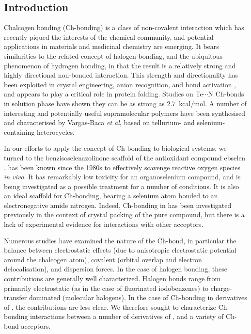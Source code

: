\begin{refsection}
\section{Introduction}
Chalcogen bonding (Ch-bonding) is a class of non-covalent interaction which has recently piqued the interests of the chemical community, and potential applications in materials and medicinal chemistry are emerging.\autocite{Mitchell2017,Wonner2017a,Fanfrlik2014,Vogel2019}
It bears similarities to the related concept of halogen bonding, and the ubiquitous phenomenon of hydrogen bonding, in that the result is a relatively strong and highly directional non-bonded interaction.\autocite{Paolo1974}
This strength and directionality has been exploited in crystal engineering\autocite{Gleiter2003,Kremer2016,Huynh2017}, anion recognition\autocite{Lim2017,Lim2018,Garrett2016}, and bond activation \autocite{Wonner2017,Benz2017,Benz2017a}, and appears to play a critical role in protein folding\autocite{Iwaoka2001,Iwaoka2015}.
Studies on Te$\cdots$N Ch-bonds in solution phase have shown they can be as strong as 2.7~kcal/mol\autocite{Garrett2015a}.
A number of interesting and potentially useful supramolecular polymers have been synthesised and characterised by Vargas-Baca \emph{et al}, based on tellurium- and selenium-containing heterocycles\autocite{Ho2016,Ho2017}.

In our efforts to apply the concept of Ch-bonding to biological systems, we turned to the benzisoselenazolinone scaffold of the antioxidant compound ebselen .
 has been known since the 1980s to effectively scavenge reactive oxygen species \emph{in vivo}.\autocite{Muller1984}
It has remarkably low toxicity for an organoselenium compound, and is being investigated as a possible treatment for a number of conditions.\autocite{Schewe1995,Kil2007,Singh2013,Parnham2000}
It is also an ideal scaffold for Ch-bonding, bearing a selenium atom bonded to an electronegative amide nitrogen.
Indeed, Ch-bonding in  has been investigated previously in the context of crystal packing of the pure compound, but there is a lack of experimental evidence for interactions with other acceptors.\autocite{Thomas2015}

Numerous studies have examined the nature of the Ch-bond, in particular the balance between electrostatic effects (due to anisotropic electrostatic potential around the chalcogen atom), covalent (orbital overlap and electron delocalisation), and dispersion forces.\autocite{Oliveira2017,Pascoe2017,DeVleeschouwer2017,Kolar2016,Gleiter2018}
In the case of halogen bonding, these contributions are generally well characterized.
Halogen bonds range from primarily electrostatic (as in the case of fluorinated iodobenzenes\autocite{Prasang2009}) to charge-transfer dominated (molecular halogens\autocite{Mulliken1950}).
In the case of Ch-bonding in derivatives of , the contributions are less clear.
We therefore sought to characterize Ch-bonding interactions between a number of derivatives of , and a variety of Ch-bond acceptors.



\end{refsection}
